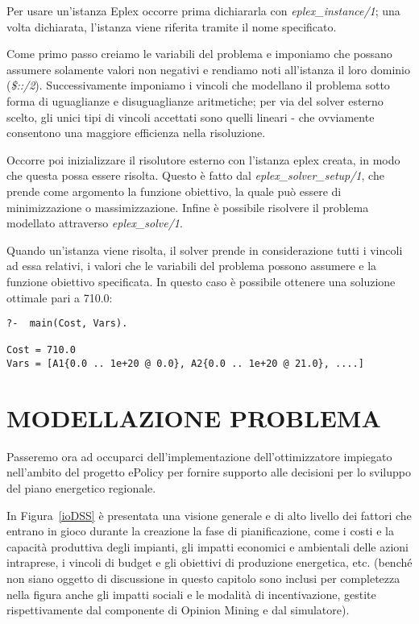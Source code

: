 \documentclass[12pt,a4paper,openright,twoside]{report}
\begin{document}
Per usare un'istanza Eplex occorre prima dichiararla con \emph{eplex\_instance/1}; una volta dichiarata, l'istanza viene riferita tramite il nome specificato. 

Come primo passo creiamo le variabili del problema e imponiamo che possano assumere solamente valori non negativi e rendiamo noti all'istanza il loro dominio (\emph{\$::/2}). Successivamente imponiamo i vincoli che modellano il problema sotto forma di uguaglianze e disuguaglianze aritmetiche; per via del solver esterno scelto, gli unici tipi di vincoli accettati sono quelli lineari - che ovviamente consentono una maggiore efficienza nella risoluzione.

Occorre poi inizializzare il risolutore esterno con l'istanza eplex creata, in modo che questa possa essere risolta. Questo è fatto dal \emph{eplex\_solver\_setup/1}, che prende come argomento la funzione obiettivo, la quale può essere di minimizzazione o massimizzazione. Infine è possibile risolvere il problema modellato attraverso \emph{eplex\_solve/1}.

Quando un'istanza viene risolta, il solver prende in considerazione tutti i vincoli ad essa relativi, i valori che le variabili del problema possono assumere e la funzione obiettivo specificata. In questo caso è possibile ottenere una soluzione ottimale pari a 710.0: 
\begin{lstlisting}
?-	main(Cost, Vars).

Cost = 710.0
Vars = [A1{0.0 .. 1e+20 @ 0.0}, A2{0.0 .. 1e+20 @ 21.0}, ....]
\end{lstlisting}

\section{MODELLAZIONE PROBLEMA}

Passeremo ora ad occuparci dell'implementazione dell'ottimizzatore impiegato nell'ambito del progetto ePolicy per fornire supporto alle decisioni per lo sviluppo del piano energetico regionale.

In Figura~\ref{ioDSS} è presentata una visione generale e di alto livello dei fattori che entrano in gioco durante la creazione la fase di pianificazione, come i costi e la capacità produttiva degli impianti, gli impatti economici e ambientali delle azioni intraprese, i vincoli di budget e gli obiettivi di produzione energetica, etc. (benché non siano oggetto di discussione in questo capitolo sono inclusi per completezza nella figura anche gli impatti sociali e le modalità di incentivazione, gestite rispettivamente dal componente di Opinion Mining e dal simulatore).
\end{document}
